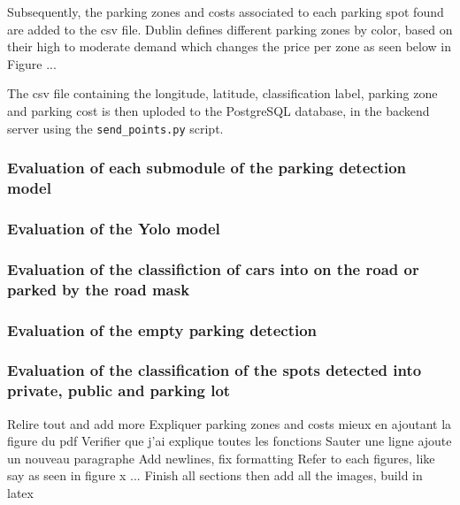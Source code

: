 Subsequently, the parking zones and costs associated to each parking spot found are added to the csv file.
Dublin defines different parking zones by color, based on their high to moderate demand which changes the price per zone as seen below in Figure ...

The csv file containing the longitude, latitude, classification label, parking zone and parking cost is then uploded to the PostgreSQL database, in the backend server using the \texttt{send\_points.py} script.

\subsubsection{Evaluation of each submodule of the parking detection model}

\subsubsection{Evaluation of the Yolo model}

\subsubsection{Evaluation of the classifiction of cars into on the road or parked by the road mask}

\subsubsection{Evaluation of the empty parking detection}

\subsubsection{Evaluation of the classification of the spots detected into private, public and parking lot}


Relire tout and add more
Expliquer parking zones and costs mieux en ajoutant la figure du pdf
Verifier que j'ai explique toutes les fonctions
Sauter une ligne ajoute un nouveau paragraphe
Add newlines, fix formatting
Refer to each figures, like say as seen in figure x ...
Finish all sections then add all the images, build in latex
